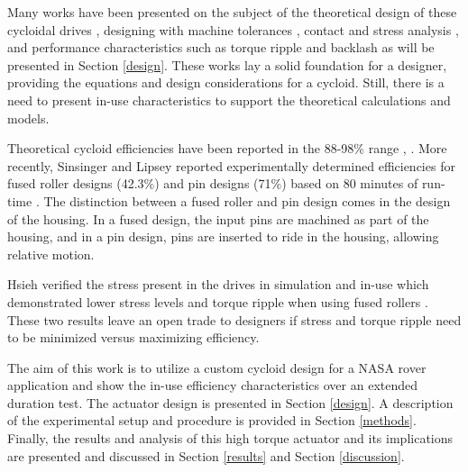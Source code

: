 Many works have been presented on the subject of the theoretical design of these cycloidal drives \cite{on_the_lobe} \cite{hwang_hsieh}, designing with machine tolerances \cite{design_and_application}, contact and stress analysis \cite{li}, and performance characteristics such as torque ripple and backlash \cite{hsieh_traditional} \cite{hsieh_dynamics} as will be presented in Section \ref{design}.
These works lay a solid foundation for a designer, providing the equations and design considerations for a cycloid.
Still, there is a need to present in-use characteristics to support the theoretical calculations and models.

Theoretical cycloid efficiencies have been reported in the 88-98\% range \cite{Malhorta}, \cite{unified_approach}.
More recently, Sinsinger and Lipsey reported experimentally determined efficiencies for fused roller designs (42.3\%) and pin designs (71\%) based on 80 minutes of run-time \cite{cycloid_vs_harmonic}.
The distinction between a fused roller and pin design comes in the design of the housing.
In a fused design, the input pins are machined as part of the housing, and in a pin design, pins are inserted to ride in the housing, allowing relative motion.

Hsieh verified the stress present in the drives in simulation and in-use which demonstrated lower stress levels and torque ripple when using fused rollers \cite{hsieh_dynamics}.
These two results leave an open trade to designers if stress and torque ripple need to be minimized versus maximizing efficiency.

The aim of this work is to utilize a custom cycloid design for a NASA rover application and show the in-use efficiency characteristics over an extended duration test.
The actuator design is presented in Section \ref{design}.
A description of the experimental setup and procedure is provided in Section \ref{methods}.
Finally, the results and analysis of this high torque actuator and its implications are presented and discussed in Section \ref{results} and Section \ref{discussion}.

